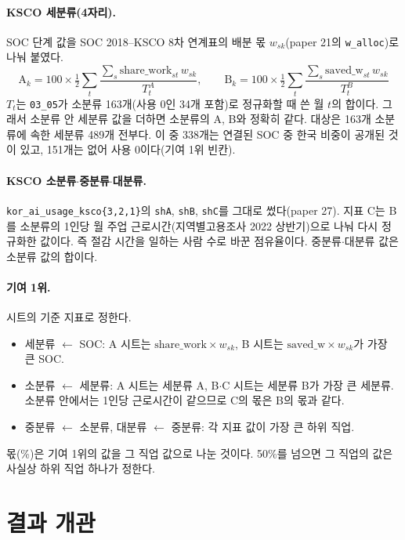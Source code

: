 \documentclass[11pt]{article}
\begin{document}
\paragraph{KSCO 세분류(4자리).} SOC 단계 값을 SOC 2018--KSCO 8차 연계표의 배분 몫 $w_{sk}$(paper 21의 \texttt{w\_alloc})로 나눠 붙였다.
\[
\text{A}_k = 100 \times \tfrac{1}{2} \sum_t \frac{\sum_s \text{share\_work}_{st}\, w_{sk}}{T^{A}_t}, \qquad
\text{B}_k = 100 \times \tfrac{1}{2} \sum_t \frac{\sum_s \text{saved\_w}_{st}\, w_{sk}}{T^{B}_t}
\]
$T_t$는 \texttt{03\_05}가 소분류 163개(사용 0인 34개 포함)로 정규화할 때 쓴 월 $t$의 합이다. 그래서 소분류 안 세분류 값을 더하면 소분류의 A, B와 정확히 같다. 대상은 163개 소분류에 속한 세분류 489개 전부다. 이 중 338개는 연결된 SOC 중 한국 비중이 공개된 것이 있고, 151개는 없어 사용 0이다(기여 1위 빈칸).

\paragraph{KSCO 소분류$\cdot$중분류$\cdot$대분류.} \texttt{kor\_ai\_usage\_ksco\{3,2,1\}}의 \texttt{shA}, \texttt{shB}, \texttt{shC}를 그대로 썼다(paper 27). 지표 C는 B를 소분류의 1인당 월 주업 근로시간(지역별고용조사 2022 상반기)으로 나눠 다시 정규화한 값이다. 즉 절감 시간을 일하는 사람 수로 바꾼 점유율이다. 중분류$\cdot$대분류 값은 소분류 값의 합이다.

\paragraph{기여 1위.} 시트의 기준 지표로 정한다.
\begin{itemize}[leftmargin=*]
  \item 세분류 $\leftarrow$ SOC: A 시트는 $\text{share\_work} \times w_{sk}$, B 시트는 $\text{saved\_w} \times w_{sk}$가 가장 큰 SOC.
  \item 소분류 $\leftarrow$ 세분류: A 시트는 세분류 A, B$\cdot$C 시트는 세분류 B가 가장 큰 세분류. 소분류 안에서는 1인당 근로시간이 같으므로 C의 몫은 B의 몫과 같다.
  \item 중분류 $\leftarrow$ 소분류, 대분류 $\leftarrow$ 중분류: 각 지표 값이 가장 큰 하위 직업.
\end{itemize}
몫(\%)은 기여 1위의 값을 그 직업 값으로 나눈 것이다. 50\%를 넘으면 그 직업의 값은 사실상 하위 직업 하나가 정한다.

\section{결과 개관}
\end{document}
